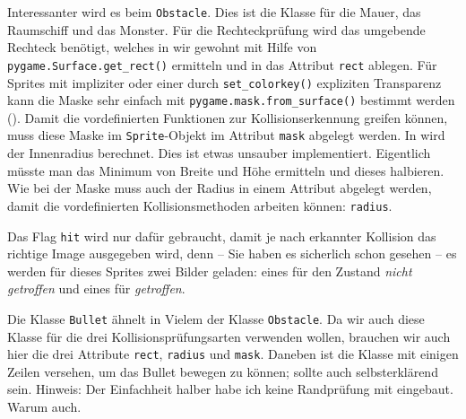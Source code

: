 
Interessanter wird es beim \texttt{Obstacle}. Dies ist die Klasse für die Mauer, das Raumschiff und das Monster. Für die Rechteckprüfung wird das umgebende Rechteck benötigt, welches in  wir gewohnt mit Hilfe von \texttt{pygame.Surface.get\_rect()} ermitteln und in das Attribut \texttt{rect} ablegen. Für Sprites mit impliziter oder einer durch \texttt{set\_colorkey()} expliziten Transparenz kann die Maske sehr einfach mit \texttt{pygame.\-mask.\-from\_surface()} bestimmt werden (). Damit die vordefinierten Funktionen zur Kollisionserkennung greifen können, muss diese Maske im \texttt{Sprite}-Objekt im Attribut \texttt{mask} abgelegt werden. In  wird der Innenradius berechnet. Dies ist etwas unsauber implementiert. Eigentlich müsste man das Minimum von Breite und Höhe ermitteln und dieses halbieren. Wie bei der Maske muss auch der Radius in einem Attribut abgelegt werden, damit die vordefinierten Kollisionsmethoden arbeiten können: \texttt{radius}. 

Das Flag \texttt{hit} wird nur dafür gebraucht, damit je nach erkannter Kollision das richtige Image ausgegeben wird, denn -- Sie haben es sicherlich schon gesehen -- es werden für dieses Sprites zwei Bilder geladen: eines für den Zustand \emph{nicht getroffen} und eines für \emph{getroffen}.


Die Klasse \texttt{Bullet} ähnelt in Vielem der Klasse \texttt{Obstacle}. Da wir auch diese Klasse für die drei Kollisionsprüfungsarten verwenden wollen, brauchen wir auch hier die drei Attribute \texttt{rect}, \texttt{radius} und \texttt{mask}. Daneben ist die Klasse mit einigen Zeilen versehen, um das Bullet bewegen zu können; sollte auch selbsterklärend sein. Hinweis: Der Einfachheit halber habe ich keine Randprüfung mit eingebaut. Warum auch.


